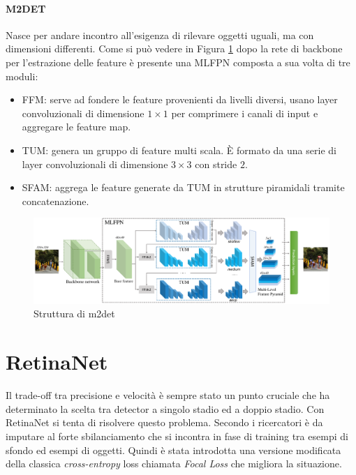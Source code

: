 \paragraph{M2DET} \cite{zhao2019m2det}
Nasce per andare incontro all'esigenza di rilevare oggetti uguali, ma con dimensioni differenti. Come si può vedere in Figura \ref{fig:m2det_architectures} dopo la rete di backbone per l'estrazione delle feature è presente una \ac{MLFPN} composta a sua volta di tre moduli:
\begin{itemize}
    \item \ac{FFM}: serve ad fondere le feature provenienti da livelli diversi, usano layer convoluzionali di dimensione $1 \times 1$ per comprimere i canali di input e aggregare le feature map. 
    \item \ac{TUM}: genera un gruppo di feature multi scala. È formato da una serie di layer convoluzionali di dimensione $3 \times 3$ con stride $2$. 
    \item \ac{SFAM}: aggrega le feature generate da \ac{TUM} in strutture piramidali tramite concatenazione.
\end{itemize}
\begin{figure}
    \centering
    \includegraphics[width=\textwidth]{images/pipeline_m2det.pdf}
    \caption{Struttura di m2det \cite{zhao2019m2det}}
    \label{fig:m2det_architectures}
\end{figure}

\section{RetinaNet}
\label{sec:retinanet}
Il trade-off tra precisione e velocità è sempre stato un punto cruciale che ha determinato la scelta tra detector a singolo stadio ed a doppio stadio. Con RetinaNet \cite{lin2017focal} si tenta di risolvere questo problema. Secondo i ricercatori è da imputare al forte sbilanciamento che si incontra in fase di training tra esempi di sfondo ed esempi di oggetti. Quindi è stata introdotta una versione modificata della classica \textit{cross-entropy} loss chiamata \textit{Focal Loss} che migliora la situazione. 
